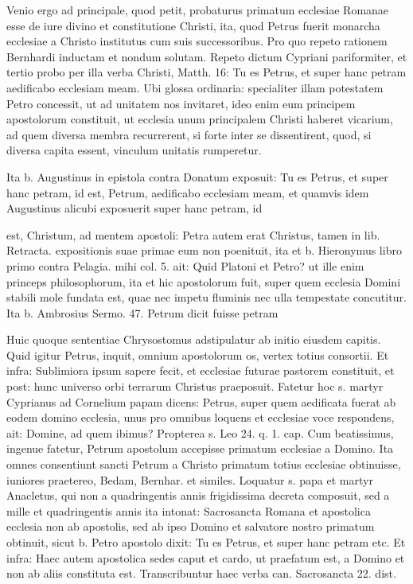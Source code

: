 Venio ergo ad principale, quod petit, probaturus primatum ecclesiae Romanae esse de iure divino et constitutione Christi, ita, quod Petrus fuerit monarcha ecclesiae a Christo institutus cum suis successoribus. Pro quo repeto rationem Bernhardi inductam et nondum solutam. Repeto dictum Cypriani pariformiter, et tertio probo per illa verba Christi, Matth. 16: Tu es Petrus, et super hanc petram aedificabo ecclesiam meam. Ubi glossa ordinaria: specialiter illam potestatem Petro concessit, ut ad unitatem nos invitaret, ideo enim eum principem apostolorum constituit, ut ecclesia unum principalem Christi haberet vicarium, ad quem diversa membra recurrerent, si forte inter se dissentirent, quod, si diversa capita essent, vinculum unitatis rumperetur.

Ita b. Augustinus in epistola contra Donatum exposuit: Tu es Petrus, et super hanc petram, id est, Petrum, aedificabo ecclesiam meam, et quamvis idem Augustinus alicubi exposuerit super hanc petram, id

est, Christum, ad mentem apostoli: Petra autem erat Christus, tamen in lib. Retracta. expositionis suae primae eum non poenituit, ita et b. Hieronymus libro primo contra Pelagia. mihi col. 5. ait: Quid Platoni et Petro? ut ille enim princeps philosophorum, ita et hic apostolorum fuit, super quem ecclesia Domini stabili mole fundata est, quae nec impetu fluminis nec ulla tempestate concutitur. Ita b. Ambrosius Sermo. 47. Petrum dicit fuisse petram

Huic quoque sententiae Chrysostomus adstipulatur ab initio eiusdem capitis. Quid igitur Petrus, inquit, omnium apostolorum os, vertex totius consortii. Et infra: Sublimiora ipsum sapere fecit, et ecclesiae futurae pastorem constituit, et post: hunc universo orbi terrarum Christus praeposuit. Fatetur hoc s. martyr Cyprianus ad Cornelium papam dicens: Petrus, super quem aedificata fuerat ab eodem domino ecclesia, unus pro omnibus loquens et ecclesiae voce respondens, ait: Domine, ad quem ibimus? Propterea s. Leo 24. q. 1. cap. Cum beatissimus, ingenue fatetur, Petrum apostolum accepisse primatum ecclesiae a Domino. Ita omnes consentiunt sancti Petrum a Christo primatum totius ecclesiae obtinuisse, iuniores praetereo, Bedam, Bernhar. et similes. Loquatur s. papa et martyr Anacletus, qui non a quadringentis annis frigidissima decreta composuit, sed a mille et quadringentis annis ita intonat: Sacrosancta Romana et apostolica ecclesia non ab apostolis, sed ab ipso Domino et salvatore nostro primatum obtinuit, sicut b. Petro apostolo dixit: Tu es Petrus, et super hanc petram etc. Et infra: Haec autem apostolica sedes caput et cardo, ut praefatum est, a Domino et non ab aliis constituta est. Transcribuntur haec verba can. Sacrosancta 22. dist.

